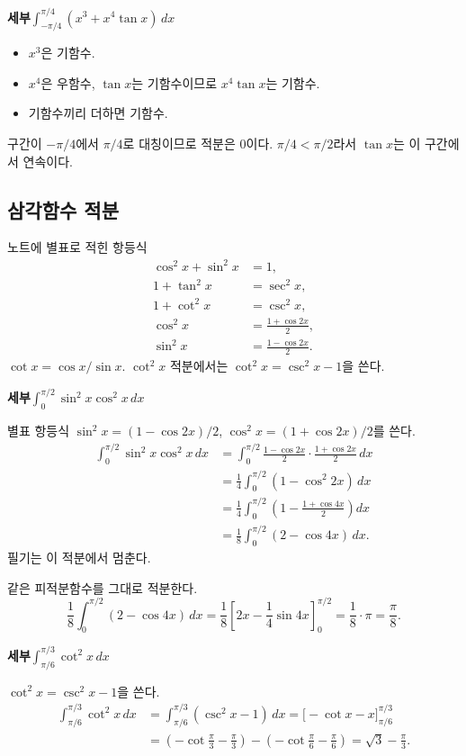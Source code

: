 \documentclass[11pt]{article}
\newcommand{\ex}[1]{\par\textbf{세부\quad #1}\par}
\begin{document}
\ex{\(\displaystyle\int_{-\pi/4}^{\pi/4}(x^{3}+x^{4}\tan x)\,dx\)}
\begin{itemize}
\item \(x^{3}\)은 기함수.
\item \(x^{4}\)은 우함수, \(\tan x\)는 기함수이므로 \(x^{4}\tan x\)는 기함수.
\item 기함수끼리 더하면 기함수.
\end{itemize}
구간이 \(-\pi/4\)에서 \(\pi/4\)로 대칭이므로 적분은 \(0\)이다. \(\pi/4<\pi/2\)라서 \(\tan x\)는 이 구간에서 연속이다.

\subsection{삼각함수 적분}

\begin{mainbox}{노트에 별표로 적힌 항등식}
\[
\begin{aligned}
\cos^{2}x+\sin^{2}x&=1,\\
1+\tan^{2}x&=\sec^{2}x,\\
1+\cot^{2}x&=\csc^{2}x,\\
\cos^{2}x&=\frac{1+\cos 2x}{2},\\
\sin^{2}x&=\frac{1-\cos 2x}{2}.
\end{aligned}
\]
\(\cot x=\cos x/\sin x\). \(\cot^{2}x\) 적분에서는 \(\cot^{2}x=\csc^{2}x-1\)을 쓴다.
\end{mainbox}

\ex{\(\displaystyle\int_{0}^{\pi/2}\sin^{2}x\cos^{2}x\,dx\)}
별표 항등식 \(\sin^{2}x=(1-\cos 2x)/2\), \(\cos^{2}x=(1+\cos 2x)/2\)를 쓴다.
\begin{align*}
\int_{0}^{\pi/2}\sin^{2}x\cos^{2}x\,dx
&=\int_{0}^{\pi/2}\frac{1-\cos 2x}{2}\cdot\frac{1+\cos 2x}{2}\,dx\\
&=\frac14\int_{0}^{\pi/2}(1-\cos^{2}2x)\,dx\\
&=\frac14\int_{0}^{\pi/2}\left(1-\frac{1+\cos 4x}{2}\right)dx\\
&=\frac18\int_{0}^{\pi/2}(2-\cos 4x)\,dx.
\end{align*}
필기는 이 적분에서 멈춘다.

\begin{fillbox}
같은 피적분함수를 그대로 적분한다.
\[
\frac18\int_{0}^{\pi/2}(2-\cos 4x)\,dx
=\frac18\left[2x-\frac14\sin 4x\right]_{0}^{\pi/2}
=\frac18\cdot\pi
=\frac{\pi}{8}.
\]
\end{fillbox}

\ex{\(\displaystyle\int_{\pi/6}^{\pi/3}\cot^{2}x\,dx\)}
\(\cot^{2}x=\csc^{2}x-1\)을 쓴다.
\begin{align*}
\int_{\pi/6}^{\pi/3}\cot^{2}x\,dx
&=\int_{\pi/6}^{\pi/3}(\csc^{2}x-1)\,dx
=\bigl[-\cot x-x\bigr]_{\pi/6}^{\pi/3}\\
&=\left(-\cot\frac{\pi}{3}-\frac{\pi}{3}\right)
-\left(-\cot\frac{\pi}{6}-\frac{\pi}{6}\right)
=\sqrt{3}-\frac{\pi}{3}.
\end{align*}
\end{document}
